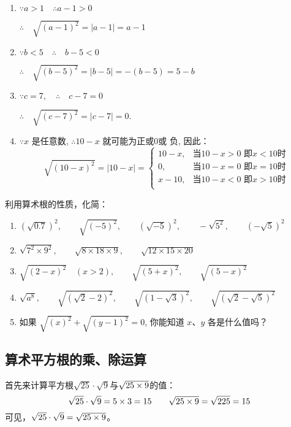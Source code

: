 \begin{solution}
\begin{enumerate}
    \item $\because a>1 \quad \therefore a-1>0$
    
    $\therefore \quad \sqrt{(a-1)^{2}}=|a-1|=a-1$
    \item   $\because b<5 \quad \therefore \quad b-5<0$
    
    $\therefore \quad \sqrt{(b-5)^{2}}=|b-5|=-(b-5)=5-b$

    \item  $\because c=7, \quad \therefore \quad c-7=0$
    
    $\therefore \quad \sqrt{(c-7)^{2}}=|c-7|=0$.

    \item  $\because x$ 是任意数, $\therefore 10-x$ 就可能为正或0或
    负, 因此：
\[\sqrt{(10-x)^2}=|10-x|=\begin{cases}
    10-x,& \text{当$10-x>0$ 即$x<10$时}\\
    0,&\text{当$10-x=0$ 即$x=10$时}\\
    x-10,&\text{当$10-x<0$ 即$x>10$时}\\
\end{cases} \]
\end{enumerate}
\end{solution}

\begin{ex}
    利用算术根的性质，化简：
\begin{enumerate}
    \item $(\sqrt{0.7})^{2},\qquad \sqrt{(-5)^{2}}, \qquad(\sqrt{-5})^{2},\qquad -\sqrt{5^{2}},\qquad (-\sqrt{5})^{2}$
    \item $\sqrt{7^{2} \times 9^{2}},\qquad \sqrt{8 \times 18 \times 9},\qquad \sqrt{12 \times 15 \times 20}$
    \item $\sqrt{(2-x)^{2}}\quad (x>2),\qquad \sqrt{(5+x)^{2}},\qquad \sqrt{(5-x)^{2}}$
    \item  $\sqrt{a^{8}},\qquad \sqrt{(\sqrt{2}-2)^{2}},\qquad \sqrt{(1-\sqrt{3})^{2}},\qquad \sqrt{(\sqrt{2}-\sqrt{5})^{2}}$
    \item 如果 $\sqrt{(x)^{2}}+\sqrt{(y-1)^{2}}=0$, 你能知道 $x$、$y$ 各是什么值吗？
\end{enumerate}
\end{ex}
    
\subsection{算术平方根的乘、除运算}
首先来计算平方根$\sqrt{25}\cdot \sqrt{9}$与$\sqrt{25\times9}$的值：
$$\sqrt{25}\cdot \sqrt{9}=5\times3=15\qquad \sqrt{25\times9}=\sqrt{225}=15$$
可见，$\sqrt{25}\cdot \sqrt{9}=\sqrt{25\times9}$。


